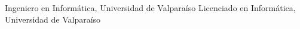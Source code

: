 %
%
%


\begin{scholarship}
					{Ingeniero en Inform\'atica, Universidad de Valpara\'iso}
									{Licenciado en Inform\'atica, Universidad de Valpara\'iso}
\end{scholarship}
